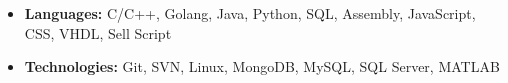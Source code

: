\documentclass[11pt,a4paper,palatine]{moderncv}        %
\begin{document}
\begin{CJK*}{UTF8}{gbsn}
  {\begin{itemize}
    \item  \textbf{Languages: }C/C++, Golang, Java, Python, SQL, Assembly, JavaScript, CSS, VHDL, Sell Script
    \item  \textbf{Technologies: }Git, SVN, Linux, MongoDB, MySQL, SQL Server, MATLAB
  \end{itemize}
}
\end{CJK*}
\end{document}
